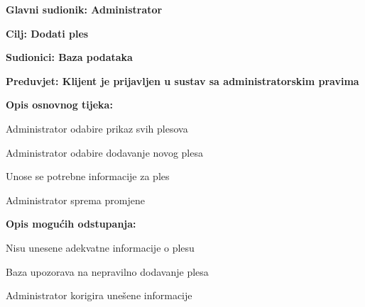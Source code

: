 						\noindent {}
						\begin{packed_item}
							
							\item \textbf{Glavni sudionik: Administrator}
							\item  \textbf{Cilj: Dodati ples} 
							\item  \textbf{Sudionici: Baza podataka}
							\item  \textbf{Preduvjet: Klijent je prijavljen u sustav sa administratorskim pravima}
							\item  \textbf{Opis osnovnog tijeka: }
							
							\item[] \begin{packed_enum}
								
								\item Administrator odabire prikaz svih plesova
								\item Administrator odabire dodavanje novog plesa
								\item Unose se potrebne informacije za ples
								\item Administrator sprema promjene
							\end{packed_enum}
							
							\item  \textbf{Opis mogućih odstupanja:}
							
							\item[] \begin{packed_item}
								
								\item[3.a] Nisu unesene adekvatne informacije o plesu
								\item[] \begin{packed_enum}
									
									\item Baza upozorava na nepravilno dodavanje plesa
									\item Administrator korigira unešene informacije
									
								\end{packed_enum}
								
							\end{packed_item}
							
						\end{packed_item}
						\bigskip
							\bigskip
					
